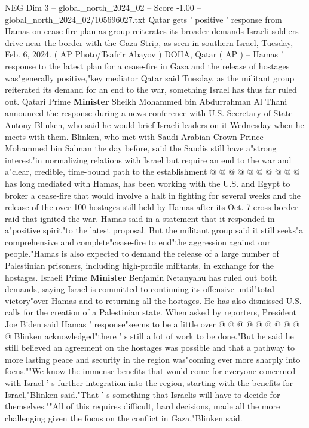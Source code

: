 \begin{textsample}{NEG Dim 3 – global\_north\_2024\_02 – Score -1.00 – global\_north\_2024\_02/105696027.txt}  \label{ex:f3_neg_210}
Qatar gets ' positive ' response from Hamas on cease-fire plan as group reiterates its broader demands Israeli soldiers drive near the border with the Gaza Strip, as seen in southern Israel, Tuesday, Feb. 6, 2024. ( AP Photo/Tsafrir Abayov ) DOHA, Qatar ( AP ) -- Hamas ' response to the latest plan for a cease-fire in Gaza and the release of hostages was"generally positive,"key mediator Qatar said Tuesday, as the militant group reiterated its demand for an end to the war, something Israel has thus far ruled out.
Qatari Prime \textbf{Minister} Sheikh Mohammed bin Abdurrahman Al Thani announced the response during a news conference with U.S.
Secretary of State Antony Blinken, who said he would brief Israeli leaders on it Wednesday when he meets with them.
Blinken, who met with Saudi Arabian Crown Prince Mohammed bin Salman the day before, said the Saudis still have a"strong interest"in normalizing relations with Israel but require an end to the war and a"clear, credible, time-bound path to the establishment @ @ @ @ @ @ @ @ @ @ has long mediated with Hamas, has been working with the U.S. and Egypt to broker a cease-fire that would involve a halt in fighting for several weeks and the release of the over 100 hostages still held by Hamas after its Oct. 7 cross-border raid that ignited the war.
Hamas said in a statement that it responded in a"positive spirit"to the latest proposal.
But the militant group said it still seeks"a comprehensive and complete"cease-fire to end"the aggression against our people."Hamas is also expected to demand the release of a large number of Palestinian prisoners, including high-profile militants, in exchange for the hostages.
Israeli Prime \textbf{Minister} Benjamin Netanyahu has ruled out both demands, saying Israel is committed to continuing its offensive until"total victory"over Hamas and to returning all the hostages.
He has also dismissed U.S. calls for the creation of a Palestinian state.
When asked by reporters, President Joe Biden said Hamas ' response"seems to be a little over @ @ @ @ @ @ @ @ @ @ Blinken acknowledged"there ' s still a lot of work to be done."But he said he still believed an agreement on the hostages was possible and that a pathway to more lasting peace and security in the region was"coming ever more sharply into focus.""We know the immense benefits that would come for everyone concerned with Israel ' s further integration into the region, starting with the benefits for Israel,"Blinken said."That ' s something that Israelis will have to decide for themselves.""All of this requires difficult, hard decisions, made all the more challenging given the focus on the conflict in Gaza,"Blinken said.

\end{textsample}
